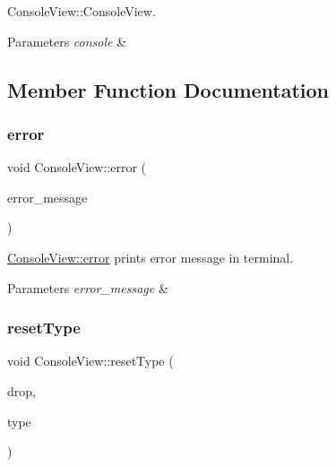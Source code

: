Console\+View\+::\+Console\+View. 


\begin{DoxyParams}{Parameters}
{\em console} & \\
\hline
\end{DoxyParams}


\subsection{Member Function Documentation}
\mbox{\label{class_console_view_a3c5b8df5fd316a1190f7beaa0460b29a}} 
\subsubsection{\texorpdfstring{error}{error}}
{\footnotesize\ttfamily void Console\+View\+::error (\begin{DoxyParamCaption}\item[{const Q\+String \&}]{error\+\_\+message }\end{DoxyParamCaption})\hspace{0.3cm}{\ttfamily [slot]}}



\hyperlink{class_console_view_a3c5b8df5fd316a1190f7beaa0460b29a}{Console\+View\+::error} prints error message in terminal. 


\begin{DoxyParams}{Parameters}
{\em error\+\_\+message} & \\
\hline
\end{DoxyParams}
\mbox{\label{class_console_view_aba1141da17dd4f424ae296142ff7a8bd}} 
\subsubsection{\texorpdfstring{reset\+Type}{resetType}}
{\footnotesize\ttfamily void Console\+View\+::reset\+Type (\begin{DoxyParamCaption}\item[{Q\+String}]{drop,  }\item[{Q\+String}]{type }\end{DoxyParamCaption})\hspace{0.3cm}{\ttfamily [slot]}}



